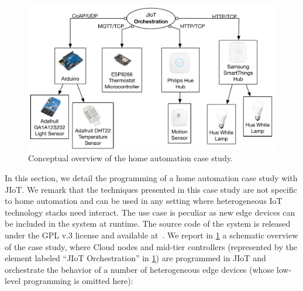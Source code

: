 \begin{figure}[t]
  \centering
  \includegraphics[width=\textwidth]{case_study_overview.pdf}
  \caption{Conceptual overview of the home automation case study.}
  \label{fig:case_study_overview} \end{figure}

In this section, we detail the programming of a home automation case study with
JIoT. We remark that the techniques presented in this case study are not
specific to home automation and can be used in any setting where heterogeneous
IoT technology stacks need interact. The use case is peculiar as new edge
devices can be included in the system at runtime. The source code of the system
is released under the GPL v.3 license and available at~\cite{jiot}. We report
in \cref{fig:case_study_overview} a schematic overview of the case study, where
Cloud nodes and mid-tier controllers (represented by the element labeled ``JIoT
Orchestration'' in \cref{fig:case_study_overview}) are programmed in JIoT and
orchestrate the behavior of a number of heterogeneous edge devices (whose
low-level programming is omitted here):


